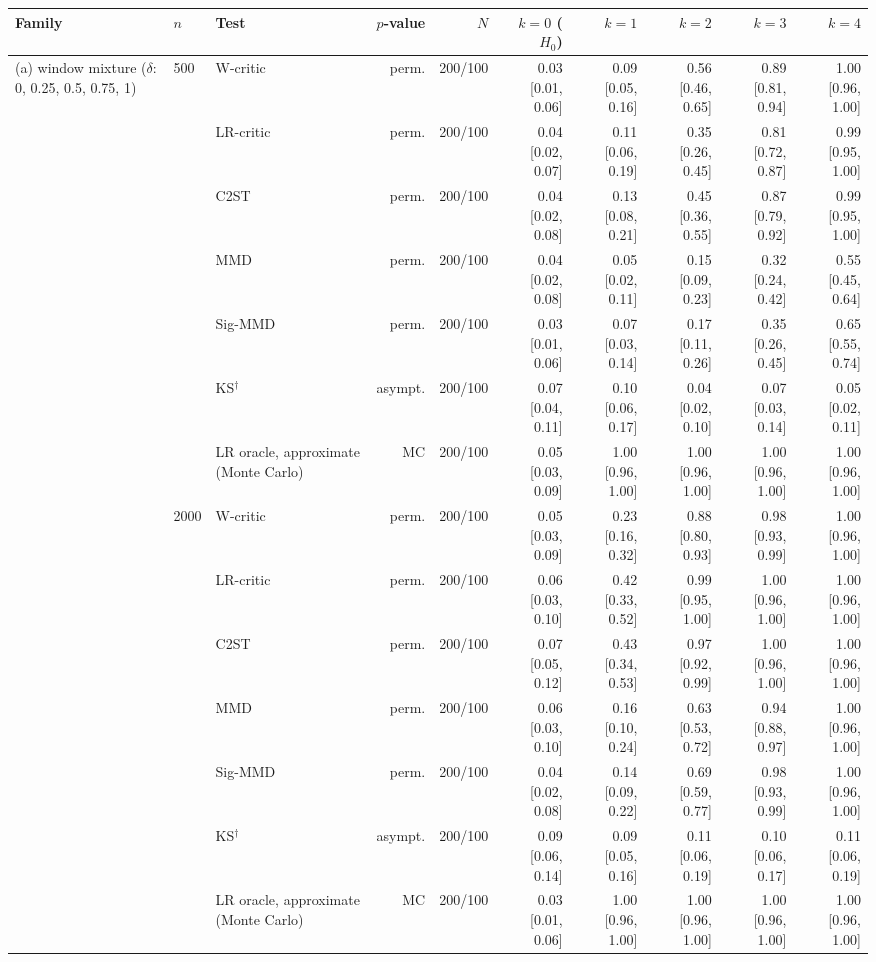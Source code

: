 \begin{tabular}{lllrrrrrrr}
\toprule
Family & $n$ & Test & $p$-value & $N$ & $k=0$ ($H_0$) & $k=1$ & $k=2$ & $k=3$ & $k=4$ \\
\midrule
(a) window mixture ($\delta$: 0, 0.25, 0.5, 0.75, 1) & 500 & W-critic & perm. & 200/100 & 0.03 [0.01, 0.06] & 0.09 [0.05, 0.16] & 0.56 [0.46, 0.65] & 0.89 [0.81, 0.94] & 1.00 [0.96, 1.00] \\
 &  & LR-critic & perm. & 200/100 & 0.04 [0.02, 0.07] & 0.11 [0.06, 0.19] & 0.35 [0.26, 0.45] & 0.81 [0.72, 0.87] & 0.99 [0.95, 1.00] \\
 &  & C2ST & perm. & 200/100 & 0.04 [0.02, 0.08] & 0.13 [0.08, 0.21] & 0.45 [0.36, 0.55] & 0.87 [0.79, 0.92] & 0.99 [0.95, 1.00] \\
 &  & MMD & perm. & 200/100 & 0.04 [0.02, 0.08] & 0.05 [0.02, 0.11] & 0.15 [0.09, 0.23] & 0.32 [0.24, 0.42] & 0.55 [0.45, 0.64] \\
 &  & Sig-MMD & perm. & 200/100 & 0.03 [0.01, 0.06] & 0.07 [0.03, 0.14] & 0.17 [0.11, 0.26] & 0.35 [0.26, 0.45] & 0.65 [0.55, 0.74] \\
 &  & KS$^{\dagger}$ & asympt. & 200/100 & 0.07 [0.04, 0.11] & 0.10 [0.06, 0.17] & 0.04 [0.02, 0.10] & 0.07 [0.03, 0.14] & 0.05 [0.02, 0.11] \\
 &  & LR oracle, approximate (Monte Carlo) & MC & 200/100 & 0.05 [0.03, 0.09] & 1.00 [0.96, 1.00] & 1.00 [0.96, 1.00] & 1.00 [0.96, 1.00] & 1.00 [0.96, 1.00] \\
 & 2000 & W-critic & perm. & 200/100 & 0.05 [0.03, 0.09] & 0.23 [0.16, 0.32] & 0.88 [0.80, 0.93] & 0.98 [0.93, 0.99] & 1.00 [0.96, 1.00] \\
 &  & LR-critic & perm. & 200/100 & 0.06 [0.03, 0.10] & 0.42 [0.33, 0.52] & 0.99 [0.95, 1.00] & 1.00 [0.96, 1.00] & 1.00 [0.96, 1.00] \\
 &  & C2ST & perm. & 200/100 & 0.07 [0.05, 0.12] & 0.43 [0.34, 0.53] & 0.97 [0.92, 0.99] & 1.00 [0.96, 1.00] & 1.00 [0.96, 1.00] \\
 &  & MMD & perm. & 200/100 & 0.06 [0.03, 0.10] & 0.16 [0.10, 0.24] & 0.63 [0.53, 0.72] & 0.94 [0.88, 0.97] & 1.00 [0.96, 1.00] \\
 &  & Sig-MMD & perm. & 200/100 & 0.04 [0.02, 0.08] & 0.14 [0.09, 0.22] & 0.69 [0.59, 0.77] & 0.98 [0.93, 0.99] & 1.00 [0.96, 1.00] \\
 &  & KS$^{\dagger}$ & asympt. & 200/100 & 0.09 [0.06, 0.14] & 0.09 [0.05, 0.16] & 0.11 [0.06, 0.19] & 0.10 [0.06, 0.17] & 0.11 [0.06, 0.19] \\
 &  & LR oracle, approximate (Monte Carlo) & MC & 200/100 & 0.03 [0.01, 0.06] & 1.00 [0.96, 1.00] & 1.00 [0.96, 1.00] & 1.00 [0.96, 1.00] & 1.00 [0.96, 1.00] \\

\end{tabular}
